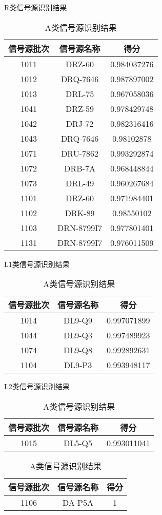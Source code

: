 \begin{table}[htbp]
	\centering
	\begin{minipage}[htbp]{7.5cm}
		\centering
		\caption{R类信号源识别结果}
		\begin{tabular}{ccc}
			\toprule
			信号源批次	&	信号源名称	&	得分			\\
			\midrule
			1011			& 	DRZ-60  		&	0.984037276 	\\
			1012		&	DRQ-7646	&	0.987897002	\\
			1013		&	DRL-75		&	0.967058036	\\
			1041		&	DRZ-59		&	0.978429748	\\
			1042		&	DRJ-72		&	0.982316416	\\
			1043		&	DRQ-7646	&	0.98102878	\\
			1071		&	DRU-7862	&	0.993292874	\\
			1072		&	DRB-7A		&	0.968448844	\\
			1073		&	DRL-49		&	0.960267684	\\
			1101			&	DRZ-60		&	0.971984401	\\
			1102 		&	DRK-89		&	0.98550102	\\
			1103 		&	DRN-8799I7	&	0.977801401	\\
			1131 		&	DRN-8799I7	&	0.976011509	\\
			\bottomrule
		\end{tabular}
	\end{minipage}
	\begin{minipage}[htbp]{7.5cm}
		\centering
		\begin{minipage}[htbp]{7.5cm}
			\centering
			\caption{L1类信号源识别结果}
			\begin{tabular}{ccc}
				\toprule
				信号源批次	&	信号源名称	&	得分			\\
				\midrule
				1014		&	DL9-Q9		&	0.997071899	\\
				1044		&	DL9-Q3		&	0.997489923	\\
				1074		&	DL9-Q8		&	0.992892631	\\
				1104			&	DL9-P3		&	0.993948117	\\
				\bottomrule
			\end{tabular}
		\end{minipage}
		\begin{minipage}[htbp]{7.5cm}
			\centering
			\caption{L2类信号源识别结果}
			\begin{tabular}{ccc}
				\toprule
				信号源批次	&	信号源名称	&	得分			\\
				\midrule
				1015		&	DL5-Q5		&	0.993011041	\\
				\bottomrule
			\end{tabular}
		\end{minipage}
		\begin{minipage}[htbp]{7.5cm}
			\centering
			\caption{A类信号源识别结果}
			\begin{tabular}{ccc}
				\toprule
				信号源批次	&	信号源名称	&	得分		\\
				\midrule
				1106			&	DA-P5A		&	1		\\
				\bottomrule
			\end{tabular}
		\end{minipage}
	\end{minipage}
\end{table}
\newpage
